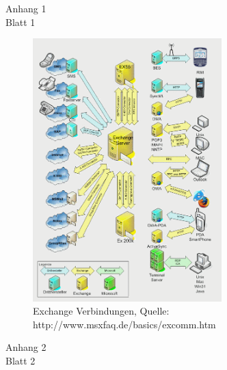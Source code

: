 
\begin{flushright}
Anhang 1\\
Blatt 1\\
\end{flushright}

\begin{figure}[h!]
\centering
\includegraphics[width=0.65\textwidth]{Abbildungen/Exchange_Verbindungen.png}
\caption*{Exchange Verbindungen, Quelle: http://www.msxfaq.de/basics/excomm.htm}
\label{Exchange Verbindung}
\end{figure}


\newpage

\begin{flushright}
Anhang 2\\
Blatt 2\\
\end{flushright}

